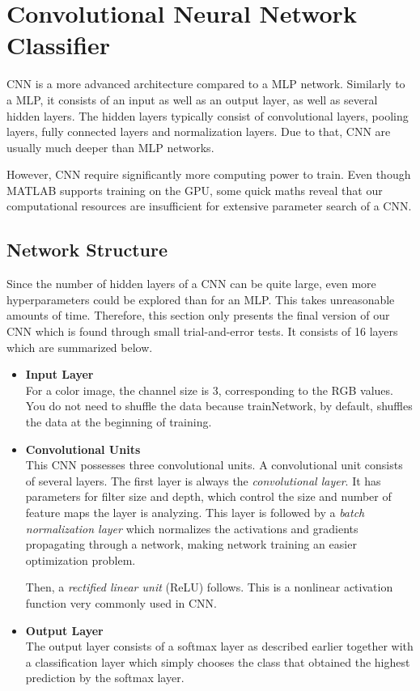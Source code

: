 \section{Convolutional Neural Network Classifier} \label{sec:CNN}
	\pagestyle{mario}

CNN is a more advanced architecture compared to a MLP network. Similarly to a MLP, it consists of an input as well as an output layer, as well as several hidden layers. The hidden layers typically consist of convolutional layers, pooling layers, fully connected layers and normalization layers. Due to that, CNN are usually much deeper than MLP networks.

However, CNN require significantly more computing power to train. Even though MATLAB supports training on the GPU, some quick maths reveal that our computational resources are insufficient for extensive parameter search of a CNN.

	
\subsection{Network Structure}

Since the number of hidden layers of a CNN can be quite large, even more hyperparameters could be explored than for an MLP. This takes unreasonable amounts of time. Therefore, this section only presents the final version of our CNN which is found through small trial-and-error tests. It consists of 16 layers which are summarized below.

\begin{itemize}
	\item \textbf{Input Layer}\\
	For a color image, the channel size is 3, corresponding to the RGB values. You do not need to shuffle the data because trainNetwork, by default, shuffles the data at the beginning of training.
	
	\item \textbf{Convolutional Units}\\
	This CNN possesses three convolutional units. A convolutional unit consists of several layers. The first layer is always the \textit{convolutional layer}. It has parameters for filter size and depth, which control the size and number of feature maps the layer is analyzing. This layer is followed by a \textit{batch normalization layer} which normalizes the activations and gradients propagating through a network, making network training an easier optimization problem.
	
	Then, a \textit{rectified linear unit} (ReLU) follows. This is a nonlinear activation function very commonly used in CNN.
	
	\item \textbf{Output Layer}\\
	The output layer consists of a softmax layer as described earlier together with a classification layer which simply chooses the class that obtained the highest prediction by the softmax layer.
	
\end{itemize}


